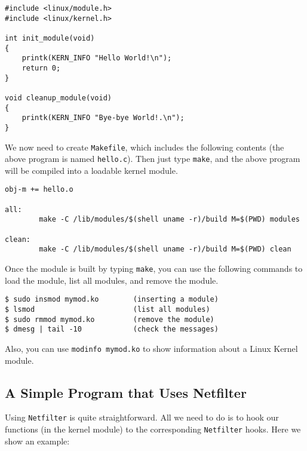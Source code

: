 \begin{lstlisting}
#include <linux/module.h>
#include <linux/kernel.h>

int init_module(void)
{
    printk(KERN_INFO "Hello World!\n");
    return 0;
}

void cleanup_module(void)
{
    printk(KERN_INFO "Bye-bye World!.\n");
}
\end{lstlisting}

We now need to create {\tt Makefile}, which includes the following
contents (the above program is named {\tt hello.c}). Then 
just type {\tt make}, and the above program will be compiled
into a loadable kernel module.


\begin{lstlisting}
obj-m += hello.o

all:
        make -C /lib/modules/$(shell uname -r)/build M=$(PWD) modules

clean:
        make -C /lib/modules/$(shell uname -r)/build M=$(PWD) clean
\end{lstlisting}


Once the module is built by typing {\tt make}, you can use the following commands to 
load the module, list all modules, and remove the module. 

\begin{lstlisting}
$ sudo insmod mymod.ko        (inserting a module)
$ lsmod                       (list all modules)
$ sudo rmmod mymod.ko         (remove the module)
$ dmesg | tail -10            (check the messages)
\end{lstlisting}

Also, you can use {\tt modinfo mymod.ko} to show information about a 
Linux Kernel module.



\subsection{A Simple Program that Uses Netfilter}

Using {\tt Netfilter} is quite straightforward. All we need to do
is to hook our functions (in the kernel module) to the corresponding
{\tt Netfilter} hooks. Here we show an example:


